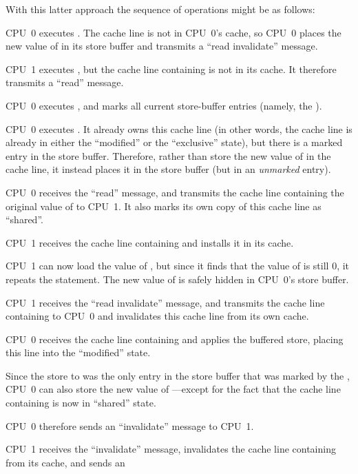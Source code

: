With this latter approach the sequence of operations might be as follows:
\begin{sequence}
\item	CPU~0 executes .
	The cache line is not in CPU~0's cache, so CPU~0 places the new
	value of  in its store buffer and transmits a ``read
	invalidate'' message.
\item	CPU~1 executes , but the cache line
	containing  is not in its cache.
	It therefore transmits a ``read'' message.
\item	CPU~0 executes , and marks all current store-buffer
	entries (namely, the ).
\item	CPU~0 executes .
	It already owns this cache line (in other words, the cache line
	is already in either the ``modified'' or the ``exclusive'' state),
	but there is a marked entry in the store buffer.
	Therefore, rather than store the new value of  in the
	cache line, it instead places it in the store buffer (but
	in an \emph{unmarked} entry).
\item	CPU~0 receives the ``read'' message, and transmits the
	cache line containing the original value of 
	to CPU~1.
	It also marks its own copy of this cache line as ``shared''.
\item	CPU~1 receives the cache line containing  and installs
	it in its cache.
\item	CPU~1 can now load the value of ,
	but since it finds that the value of  is still 0, it repeats
	the  statement.
	The new value of  is safely hidden in CPU~0's store buffer.
\item	CPU~1 receives the ``read invalidate'' message, and
	transmits the cache line containing  to CPU~0 and
	invalidates this cache line from its own cache.
\item	CPU~0 receives the cache line containing  and applies
	the buffered store, placing this line into the ``modified''
	state.
\item	Since the store to  was the only
	entry in the store buffer that was marked by the ,
	CPU~0 can also store the new value of ---except for the
	fact that the cache line containing  is now in ``shared''
	state.
\item	CPU~0 therefore sends an ``invalidate'' message to CPU~1.
\item	CPU~1 receives the ``invalidate'' message, invalidates the
	cache line containing  from its cache, and sends an

\end{sequence}
